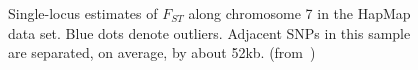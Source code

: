 \documentclass[12pt]{article}
\begin{document}
\begin{figure}
\begin{center}
\end{center}
\caption{Single-locus estimates of $F_{ST}$ along chromosome 7 in the
  HapMap data set. Blue dots denote outliers. Adjacent SNPs in this
  sample are separated, on average, by about
  52kb. (from~\cite{Guo-etal-2009})}\label{fig:low-res-SNP}
\end{figure}
\end{document}

